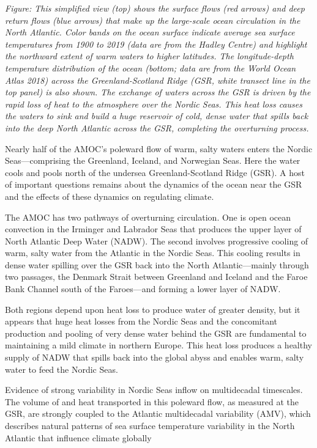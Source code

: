 \documentclass[
]{book}
\begin{document}
\emph{Figure: This simplified view (top) shows the surface flows (red arrows) and deep return flows (blue arrows) that make up the large-scale ocean circulation in the North Atlantic. Color bands on the ocean surface indicate average sea surface temperatures from 1900 to 2019 (data are from the Hadley Centre) and highlight the northward extent of warm waters to higher latitudes. The longitude-depth temperature distribution of the ocean (bottom; data are from the World Ocean Atlas 2018) across the Greenland-Scotland Ridge (GSR, white transect line in the top panel) is also shown. The exchange of waters across the GSR is driven by the rapid loss of heat to the atmosphere over the Nordic Seas. This heat loss causes the waters to sink and build a huge reservoir of cold, dense water that spills back into the deep North Atlantic across the GSR, completing the overturning process.}

Nearly half of the AMOC's poleward flow of warm, salty waters enters the Nordic Seas---comprising the Greenland, Iceland, and Norwegian Seas. Here the water cools and pools north of the undersea Greenland-Scotland Ridge (GSR).
A host of important questions remains about the dynamics of the ocean near the GSR and the effects of these dynamics on regulating climate.

The AMOC has two pathways of overturning circulation. One is open ocean convection in the Irminger and Labrador Seas that produces the upper layer of North Atlantic Deep Water (NADW).
The second involves progressive cooling of warm, salty water from the Atlantic in the Nordic Seas. This cooling results in dense water spilling over the GSR back into the North Atlantic---mainly through two passages, the Denmark Strait between Greenland and Iceland and the Faroe Bank Channel south of the Faroes---and forming a lower layer of NADW.

Both regions depend upon heat loss to produce water of greater density, but it appears that huge heat losses from the Nordic Seas and the concomitant production and pooling of very dense water behind the GSR are fundamental to maintaining a mild climate in northern Europe. This heat loss produces a healthy supply of NADW that spills back into the global abyss and enables warm, salty water to feed the Nordic Seas.

Evidence of strong variability in Nordic Seas inflow on multidecadal timescales.
The volume of and heat transported in this poleward flow, as measured at the GSR, are strongly coupled to the Atlantic multidecadal variability (AMV), which describes natural patterns of sea surface temperature variability in the North Atlantic that influence climate globally
\end{document}
